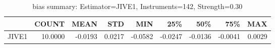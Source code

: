 \begin{table}[ht]
\centering
\caption{bias summary: Estimator=JIVE1, Instruments=142, Strength=0.30}
\begin{tabular}{lrrrrrrrr}
\toprule
 & COUNT & MEAN & STD & MIN & 25\% & 50\% & 75\% & MAX \\
\midrule
JIVE1 & 10.0000 & -0.0193 & 0.0217 & -0.0582 & -0.0247 & -0.0136 & -0.0041 & 0.0029 \\
\bottomrule
\end{tabular}
\end{table}
